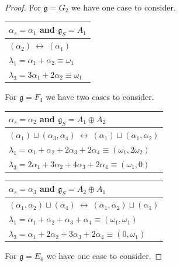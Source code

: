 \documentclass[a4paper, 12pt, reqno, english]{amsart}
\numberwithin{equation}{section}
\numberwithin{figure}{section}
\theoremstyle{plain}
\theoremstyle{plain}
\theoremstyle{plain}
\theoremstyle{plain}
\theoremstyle{plain}
\theoremstyle{definition}
\theoremstyle{definition}
\theoremstyle{definition}
\theoremstyle{remark}
\theoremstyle{definition}
\theoremstyle{definition}
\newcommand{\lieg}{\mathfrak{g}}
\begin{document}
\begin{proof}
For $\lieg = G_2$ we have one case to consider.

{\renewcommand{\arraystretch}{1.4}
\begin{center}
\begin{tabular}{|l|} 
\hline
$\alpha_s = \alpha_1$ and $\lieg_S = A_1$ \\
\hline \hline
$(\alpha_2) \ \leftrightarrow \ (\alpha_1)$ \\
\hline
$\lambda_1 = \alpha_1 + \alpha_2 \equiv \omega_1$ \\
\hline
$\lambda_3 = 3 \alpha_1 + 2 \alpha_2 \equiv \omega_1$ \\
\hline
\end{tabular}
\end{center}}

For $\lieg = F_4$ we have two cases to consider.

{\renewcommand{\arraystretch}{1.4}
\begin{center}
\begin{tabular}{|l|} 
\hline
$\alpha_s = \alpha_2$ and $\lieg_S = A_1 \oplus A_2$ \\
\hline \hline
$(\alpha_1) \sqcup (\alpha_3, \alpha_4) \ \leftrightarrow \ (\alpha_1) \sqcup (\alpha_1, \alpha_2)$ \\
\hline
$\lambda_1 = \alpha_1 + \alpha_2 + 2 \alpha_3 + 2 \alpha_4 \equiv (\omega_1, 2 \omega_2)$ \\
\hline
$\lambda_3 = 2 \alpha_1 + 3 \alpha_2 + 4 \alpha_3 + 2 \alpha_4 \equiv (\omega_1, 0)$ \\
\hline
\end{tabular}
\end{center}}

{\renewcommand{\arraystretch}{1.4}
\begin{center}
\begin{tabular}{|l|} 
\hline
$\alpha_s = \alpha_3$ and $\lieg_S = A_2 \oplus A_1$ \\
\hline \hline
$(\alpha_1, \alpha_2) \sqcup (\alpha_4) \ \leftrightarrow \ (\alpha_1, \alpha_2) \sqcup (\alpha_1)$ \\
\hline
$\lambda_1 = \alpha_1 + \alpha_2 + \alpha_3 + \alpha_4 \equiv (\omega_1, \omega_1)$ \\
\hline
$\lambda_3 = \alpha_1 + 2 \alpha_2 + 3 \alpha_3 + 2 \alpha_4 \equiv (0, \omega_1)$ \\
\hline
\end{tabular}
\end{center}}

For $\lieg = E_6$ we have one case to consider.


\end{proof}
\end{document}
